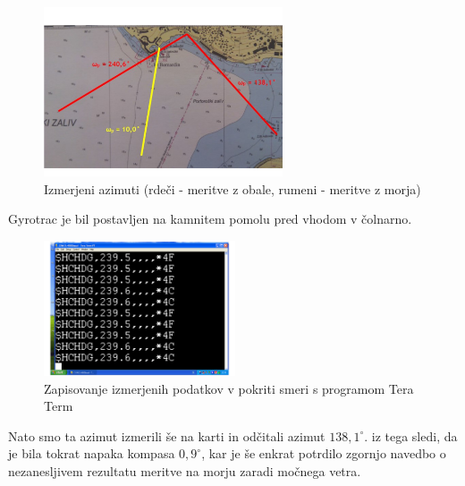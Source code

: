 \begin{figure}
	\centering
	\includegraphics[height=5cm]{Karta_Azimuti}
	\caption{Izmerjeni azimuti (rdeči - meritve z obale, rumeni - meritve z morja)}
	\label{fig:Karta_IzmerAzimuti}       %
\end{figure}


Gyrotrac je bil postavljen na kamnitem pomolu pred vhodom v čolnarno.

\begin{figure}
	\centering
	\includegraphics[height=4cm]{TT_zapisovanje}
	\caption{Zapisovanje izmerjenih podatkov v pokriti smeri s programom Tera Term}
	\label{fig:TT_zapisovanjePokriteSmeri}       %
\end{figure}

Nato smo ta azimut izmerili še na karti in odčitali azimut $138,1^{\circ}$. iz tega sledi, da je bila tokrat napaka kompasa $0,9^{\circ}$, kar je še enkrat potrdilo zgornjo navedbo o nezanesljivem rezultatu meritve na morju zaradi močnega vetra. 




